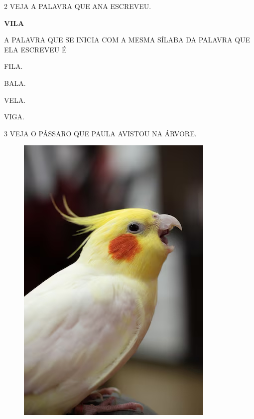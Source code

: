 \num{2} VEJA A PALAVRA QUE ANA ESCREVEU.

\begin{center}
\textbf{VILA}
\end{center}

A PALAVRA QUE SE INICIA COM A MESMA SÍLABA DA PALAVRA QUE ELA ESCREVEU É

\begin{escolha}

\item FILA.

\item BALA.

\item VELA.

\item VIGA.

\end{escolha}

\num{3} VEJA O PÁSSARO QUE PAULA AVISTOU NA ÁRVORE.

\begin{figure}[H]
\centering
\includegraphics[width=\textwidth]{./media/image231.png}
\end{figure}

